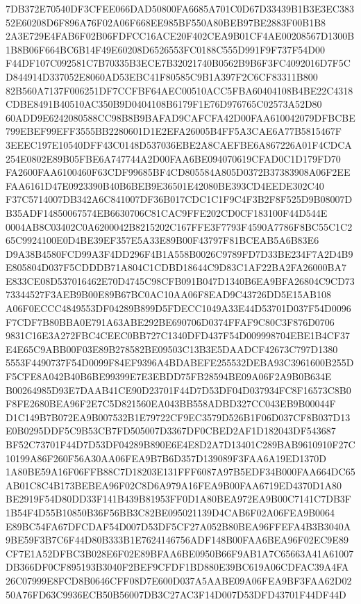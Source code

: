 \documentclass[UTF8,fontset=fandol,zihao=-4,a4paper]{ctexart}
\begin{document}
{{7DB372E70540DF3CFEE066DAD50800FA6685A701C0D67D33439B1B3E3EC38352E60208D6F896A76F02A06F668EE985BF550A80BEB97BE2883F00B1B8
2A3E729E4FAB6F02B06FDFCC16ACE20F402CEA9B01CF4AE00208567D1300B1B8B06F664BC6B14F49E60208D6526553FC0188C555D991F9F737F54D00
F44DF107C092581C7B70335B3ECE7B32021740B0562B9B6F3FC4092016D7F5CD844914D337052E8060AD53EBC41F80585C9B1A397F2C6CF83311B800
82B560A7137F006251DF7CCFBF64AEC00510ACC5FBA60404108B4BE22C4318CDBE8491B40510AC350B9D0404108B6179F1E76D976765C02573A52D80
60ADD9E6242080588CC98B8B9BAFAD9CAFCFA42D00FAA610042079DFBCBE799EBEF99EFF3555BB2280601D1E2EFA26005B4FF5A3CAE6A77B5815467F
3EEEC197E10540DFF43C0148D537036EBE2A8CAEFBE6A867226A01F4CDCA254E0802E89B05FBE6A747744A2D00FAA6BE094070619CFAD0C1D179FD70
FA2600FAA6100460F63CDF99685BF4CD805584A805D0372B37383908A06F2EEFAA6161D47E0923390B40B6BEB9E36501E42080BE393CD4EEDE302C40
F37C5714007DB342A6C841007DF36B017CDC1C1F9C4F3B2F8F525D9B08007DB35ADF14850067574EB6630706C81CAC9FFE202CD0CF183100F44D544E
0004AB8C03402C0A6200042B8215202C167FFE3F7793F4590A7786F8BC55C1C265C9924100E0D4BE39EF357E5A33E89B00F43797F81BCEAB5A6B83E6
D9A38B4580FCD99A3F4DD296F4B1A558B0026C9789FD7D33BE234F7A2D4B9E805804D037F5CDDDB71A804C1CDBD18644C9D83C1AF22BA2FA26000BA7
E833CE08D537016462E70D4745C98CFB091B047D1340B6EA9BFA26804C9CD7373344527F3AEB9B00E89B67BC0AC10AA06F8EAD9C43726DD5E15AB108
A06F0ECCC4849553DF04289B899D5FDECC1049A33E44D53701D037F54D0096F7CDF7B80BBA0E791A63ABE292BE690706D0374FFAF9C80C3F876D0706
9831C16E3A272FBC4CEEC0BB727C1340DFD437F54D009998704EBE1B4CF37E4E65C9ABB00F03E89B278582BE09503C13B3E5DAADCF42673C797D1380
5553F4490737F54D0099F84EF9396A4BDABEFE255532DEBA93C3961600B255DF5CFE8A042B40B6BE99399E7E3EBDD75FB28594BE09A06F2A9B0B634E
B00264985D93E7DAAB41CE90D23701F44D7D53DF04D037934FC8F16573C8B0F8FE2680BEA96F2E7C5D821560EA043BB558ADBD327CC043EB9B00044F
D1C149B7B072EA9B007532B1E79722CF9EC3579D526B1F06D037CF8B037D13E0B0295DDF5C9B53CB7FD505007D3367DF0CBED2AF1D182043DF543687
BF52C73701F44D7D53DF04289B890E6E4E8D2A7D13401C289BAB9610910F27C10199A86F260F56A30AA06FEA9B7B6D357D139089F3FAA6A19ED1370D
1A80BE59A16F06FFB88C7D18203E131FFF6087A97B5EDF34B000FAA664DC65AB01C8C4B173BEBEA96F02C8D6A979A16FEA9B00FAA6719ED4370D1A80
BE2919F54D80DD33F141B439B81953FF0D1A80BEA972EA9B00C7141C7DB3F1B54F4D55B10850B36F56BB3C82BE095021139D4CAB6F02A06FEA9B0064
E89BC54FA67DFCDAF54D007D53DF5CF27A052B80BEA96FFEFA4B3B3040A9BE59F3B7C6F44D80B333B1E7624146756ADF148B00FAA6BEA96F02EC9E89
CF7E1A52DFBC3B028E6F02E89BFAA6BE0950B66F9AB1A7C65663A41A61007DB366DF0CF895193B3040F2BEF9CFDF1BD880E39BC619A06CDFAC39A4FA
26C07999E8FCD8B0646CFF08D7E600D037A5AABE09A06FEA9BF3FAA62D0250A76FD63C9936ECB50B56007DB3C27AC3F14D007D53DFD43701F44DF44D
}}
\end{document}
